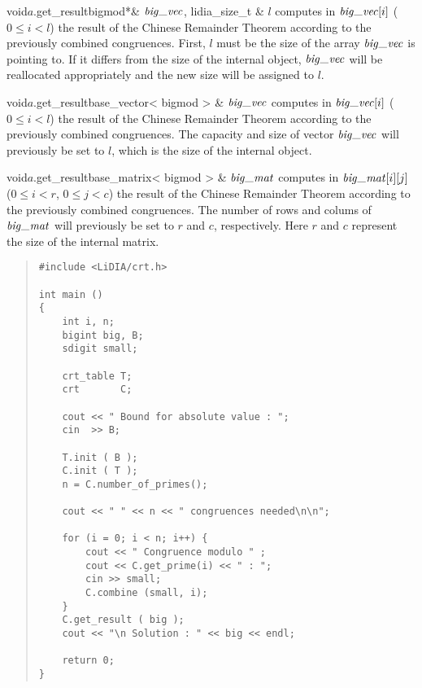 \begin{fcode}{void}{$a$.get_result}{bigmod*& $\bigvec$, lidia_size_t & $l$}
  computes in $\bigvec[i]$ ($0 \leq i < l$) the result of the Chinese Remainder Theorem
  according to the previously combined congruences.  First, $l$ must be the size of the array
  $\bigvec$ is pointing to.  If it differs from the size of the internal object, $\bigvec$ will
  be reallocated appropriately and the new size will be assigned to $l$.
\end{fcode}

\begin{fcode}{void}{$a$.get_result}{base_vector< bigmod > & $\bigvec$}
  computes in $\bigvec[i]$ ($0 \leq i < l$) the result of the Chinese Remainder Theorem
  according to the previously combined congruences.  The capacity and size of vector $\bigvec$
  will previously be set to $l$, which is the size of the internal object.
\end{fcode}

\begin{fcode}{void}{$a$.get_result}{base_matrix< bigmod > & $\bigmat$}
  computes in $\bigmat[i][j]$ ($0 \leq i < r$, $0 \leq j < c$) the result of the Chinese
  Remainder Theorem according to the previously combined congruences.  The number of rows and
  colums of $\bigmat$ will previously be set to $r$ and $c$, respectively.  Here $r$ and $c$
  represent the size of the internal matrix.
\end{fcode}



\EXAMPLES

\begin{quote}
\begin{verbatim}
#include <LiDIA/crt.h>

int main ()
{
    int i, n;
    bigint big, B;
    sdigit small;

    crt_table T;
    crt       C;

    cout << " Bound for absolute value : ";
    cin  >> B;

    T.init ( B );
    C.init ( T );
    n = C.number_of_primes();

    cout << " " << n << " congruences needed\n\n";

    for (i = 0; i < n; i++) {
        cout << " Congruence modulo " ;
        cout << C.get_prime(i) << " : ";
        cin >> small;
        C.combine (small, i);
    }
    C.get_result ( big );
    cout << "\n Solution : " << big << endl;

    return 0;
}
\end{verbatim}
\end{quote}

